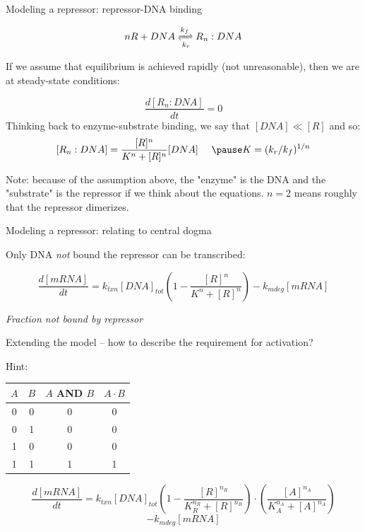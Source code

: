 \documentclass[handout]{beamer} %
\begin{document}
\begin{frame}{Modeling a repressor: repressor-DNA binding}

$$ nR + DNA \xrightleftharpoons[k_r]{k_f} R_n:DNA $$ \pause

If we assume that equilibrium is achieved rapidly (not unreasonable), then we are at steady-state conditions:

$$ \frac{d[R_n:DNA]}{dt} = 0 $$ \pause
Thinking back to enzyme-substrate binding, we say that $[DNA] \ll [R]$ and so:
$$ [R_n:DNA] = \frac{[R]^n}{K^n + [R]^n} [DNA] ~~~~ \pause K = (k_r / k_f)^{1/n} $$\pause

Note: because of the assumption above, the "enzyme" is the DNA and the "substrate" is the repressor if we think about the equations. \pause $n=2$ means roughly that the repressor dimerizes.

\end{frame}

{

}

\begin{frame}{Modeling a repressor: relating to central dogma}

Only DNA \emph{not} bound the repressor can be transcribed:

$$ \frac{d[mRNA]}{dt} = k_{txn}[DNA]_{tot}\left ( 1 - \frac{[R]^n}{K^n + [R]^n} \right ) - k_{mdeg}[mRNA] $$

\pause \hspace{37 mm}\emph{Fraction not bound by repressor}

\end{frame}

{

}

\begin{frame}{Extending the model -- how to describe the requirement for activation?}

\pause

Hint:

\begin{center}\begin{tabular}{cc|c|c}
	$A$ & $B$ & $A$ AND $B$ & $A \cdot B$ \\ \hline
	0 & 0 & 0 & 0\\
	0 & 1 & 0 & 0\\
	1 & 0 & 0 & 0\\
	1 & 1 & 1 & 1\\
\end{tabular}\end{center}

\pause

$$ \frac{d[mRNA]}{dt} = k_{txn}[DNA]_{tot}\left ( 1 - \frac{[R]^{n_R}}{K_R^{n_R} + [R]^{n_R}} \right ) \cdot \left ( \frac{[A]^{n_A}}{K_A^{n_A} + [A]^{n_A}} \right ) $$$$- k_{mdeg}[mRNA] $$

\end{frame}
\end{document}
